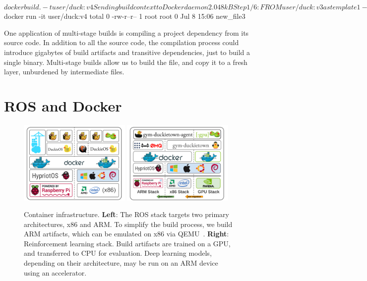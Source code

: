 \documentclass[12pt,initial,twoside,maitrise]{dms}
\numberwithin{equation}{section}
\numberwithin{table}{chapter}
\numberwithin{figure}{chapter}
\begin{document}
\begin{pclisting}
~$ docker build . -t user/duck:v4
Sending build context to Docker daemon  2.048kB
Step 1/6 : FROM user/duck:v3 as template1
--- e3b75ef8ecc4
Step 2/6 : FROM daphne/duck as template2
--- ea2f90g8de9e
Step 3/6 : COPY --from=template1 new_file1 new_file2
---> 72b96668378e
Step 4/6 : FROM donald/duck:v3 as template3
---> e3b75ef8ecc4
Step 5/6 : COPY --from=template2 new_file2 new_file3
---> cb1b84277228
Step 6/6 : CMD ls
---> Running in cb1b84277228
Removing intermediate container cb1b84277228
---> c7dc5dd63e77
Successfully built c7dc5dd63e77
Successfully tagged user/duck:v4
~$ docker run -it user/duck:v4
total 0
-rw-r--r-- 1 root root 0 Jul  8 15:06 new_file3
\end{pclisting}
%
One application of multi-stage builds is compiling a project dependency from its source code. In addition to all the source code, the compilation process could introduce gigabytes of build artifacts and transitive dependencies, just to build a single binary. Multi-stage builds allow us to build the file, and copy it to a fresh layer, unburdened by intermediate files.

\section{ROS and Docker}\label{sec:ros-docker}

\begin{figure}[ht]
    \centering
    \includegraphics[width=0.48\textwidth]{docker_stack_1.png}
    \includegraphics[width=0.48\textwidth]{docker_stack_2.png}
    \caption{Container infrastructure. \textbf{Left}: The ROS stack targets two primary architectures, x86 and ARM. To simplify the build process, we build ARM artifacts, which can be emulated on x86 via QEMU~\citep{bellard2005qemu}. \textbf{Right}: Reinforcement learning stack. Build artifacts are trained on a GPU, and transferred to CPU for evaluation. Deep learning models, depending on their architecture, may be run on an ARM device using an accelerator.}
    \label{fig:docker}
\end{figure}
\end{document}
